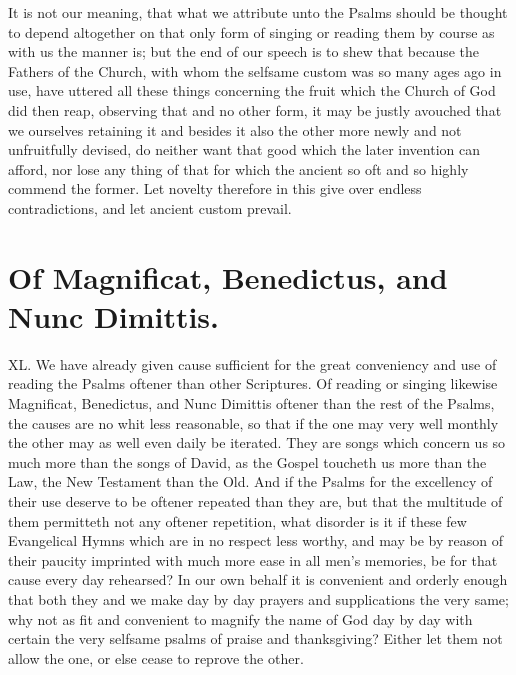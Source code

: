 It is not our meaning, that what we attribute unto the Psalms should be thought to depend altogether on that only form of singing or reading them by course as with us the manner is; but the end of our speech is to shew that because the Fathers of the Church, with whom the selfsame custom was so many ages ago in use, have uttered all these things concerning the fruit which the Church of God did then reap, observing that and no other form, it may be justly avouched that we ourselves retaining it and besides it also the other more newly and not unfruitfully devised, do neither want that good which the later invention can afford, nor lose any thing of that for which the ancient so oft and so highly commend the former. Let novelty therefore in this give over endless contradictions, and let ancient custom prevail.

\section*{Of Magnificat, Benedictus, and Nunc Dimittis.}
XL. We have already given cause sufficient for the great conveniency and use of reading the Psalms oftener than other Scriptures. Of reading or singing likewise Magnificat,  Benedictus, and Nunc Dimittis oftener than the rest of the Psalms, the causes are no whit less reasonable, so that if the one may very well monthly the other may as well even daily be iterated. They are songs which concern us so much more than the songs of David, as the Gospel toucheth us more than the Law, the New Testament than the Old. And if the Psalms for the excellency of their use deserve to be oftener repeated than they are, but that the multitude of them permitteth not any oftener repetition, what disorder is it if these few Evangelical Hymns which are in no respect less worthy, and may be by reason of their paucity imprinted with much more ease in all men’s memories, be for that cause every day rehearsed? In our own behalf it is convenient and orderly enough that both they and we make day by day prayers and supplications the very same; why not as fit and convenient to magnify the name of God day by day with certain the very selfsame psalms of praise and thanksgiving? Either let them not allow the one, or else cease to reprove the other.
